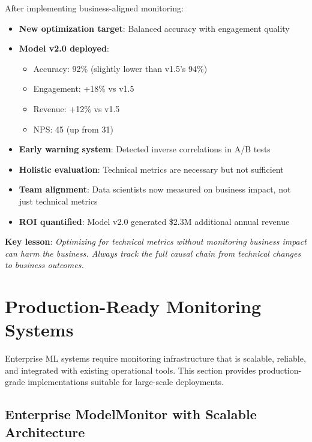 After implementing business-aligned monitoring:

\begin{itemize}
    \item \textbf{New optimization target}: Balanced accuracy with engagement quality
    \item \textbf{Model v2.0 deployed}:
        \begin{itemize}
            \item Accuracy: 92\% (slightly lower than v1.5's 94\%)
            \item Engagement: +18\% vs v1.5
            \item Revenue: +12\% vs v1.5
            \item NPS: 45 (up from 31)
        \end{itemize}
    \item \textbf{Early warning system}: Detected inverse correlations in A/B tests
    \item \textbf{Holistic evaluation}: Technical metrics are necessary but not sufficient
    \item \textbf{Team alignment}: Data scientists now measured on business impact, not just technical metrics
    \item \textbf{ROI quantified}: Model v2.0 generated \$2.3M additional annual revenue
\end{itemize}

\textbf{Key lesson}: \textit{Optimizing for technical metrics without monitoring business impact can harm the business. Always track the full causal chain from technical changes to business outcomes.}

\section{Production-Ready Monitoring Systems}

Enterprise ML systems require monitoring infrastructure that is scalable, reliable, and integrated with existing operational tools. This section provides production-grade implementations suitable for large-scale deployments.

\subsection{Enterprise ModelMonitor with Scalable Architecture}

